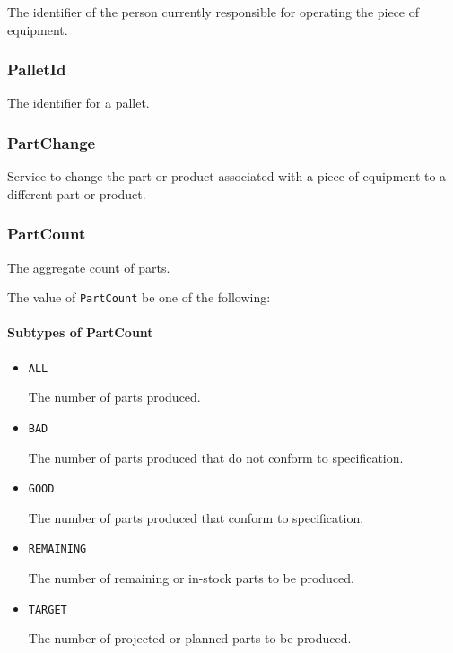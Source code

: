 The identifier of the person currently responsible for operating the piece of equipment.


\subsubsection{PalletId}
\label{sec:PalletId}



The identifier for a pallet.


\subsubsection{PartChange}
\label{sec:PartChange}



Service to change the part or product associated with a piece of equipment to a different part or product.


\subsubsection{PartCount}
\label{sec:PartCount}



The aggregate count of parts.


The value of \texttt{PartCount} \MUST be one of the following: 

\FloatBarrier

\paragraph{Subtypes of PartCount}\mbox{}
\label{sec:Subtypes of PartCount}

\begin{itemize}

\item \texttt{ALL}


The number of parts produced. 

\item \texttt{BAD}


The number of parts produced that do not conform to specification.

\item \texttt{GOOD}


The number of parts produced that conform to specification.


\item \texttt{REMAINING}


The number of remaining or in-stock parts to be produced.

\item \texttt{TARGET}


The number of projected or planned parts to be produced.


\end{itemize}

